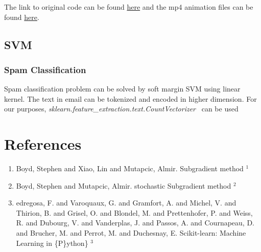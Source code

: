 \documentclass[twoside,twocolumn]{article}
\begin{document}
The link to original code can be found \href{https://github.com/cmaspi/subgradient_method/blob/main/code/step_illustration.ipynb}{here} and the mp4 animation files can be found \href{https://github.com/cmaspi/subgradient_method/tree/main/results}{here}.

\subsection{SVM}
\subsubsection{Spam Classification}
Spam classification problem can be solved by soft margin SVM using linear kernel. The text in email can be tokenized and encoded in higher dimension. For our purposes, \emph{sklearn.feature\_extraction.text.CountVectorizer}~\cite{scikit-learn} can be used  
    

    











{\small


}

\section{References}
\begin{enumerate}
    \item Boyd, Stephen and Xiao, Lin and Mutapcic, Almir. Subgradient method \href{https://info.usherbrooke.ca/jpdussault/ROP771H17/subgrad_method_notes.pdf}{$^1$}
    \item Boyd, Stephen and Mutapcic, Almir. stochastic Subgradient method \href{https://web.stanford.edu/class/ee364b/lectures/stoch_subgrad_notes.pdf}{$^2$}
    \item edregosa, F. and Varoquaux, G. and Gramfort, A. and Michel, V.
    and Thirion, B. and Grisel, O. and Blondel, M. and Prettenhofer, P.
    and Weiss, R. and Dubourg, V. and Vanderplas, J. and Passos, A. and
    Cournapeau, D. and Brucher, M. and Perrot, M. and Duchesnay, E. Scikit-learn: Machine Learning in \{P\}ython\} $^3$
\end{enumerate}
\end{document}
